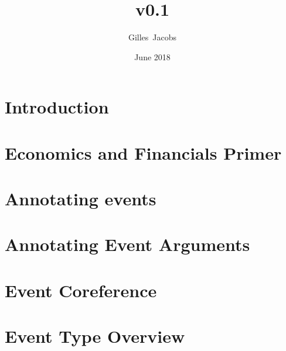 \documentclass[a4paper]{report}
\title{\scheme v0.1}
\author{Gilles~Jacobs}
\date{June 2018}
\begin{document}
\maketitle
\tableofcontents
\newpage

\chapter{Introduction}


\chapter{Economics and Financials Primer}


\chapter{Annotating events}
\label{chapter/events}


\chapter{Annotating Event Arguments}
\label{chapter/arguments}


%

\chapter{Event Coreference}
\label{chapter/coref}


\chapter{Event Type Overview}
\label{chapter/eventtype}


\printbibliography

% 
\end{document}
